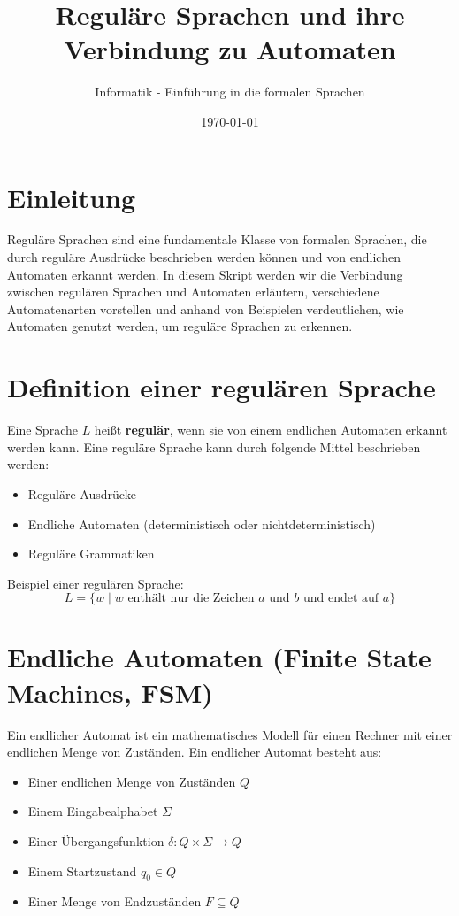 \documentclass[a4paper,12pt]{article}
\begin{document}
	
	\title{Reguläre Sprachen und ihre Verbindung zu Automaten}
	\author{Informatik - Einführung in die formalen Sprachen}
	\date{\today}
	\maketitle
	
	\section*{Einleitung}
	
	Reguläre Sprachen sind eine fundamentale Klasse von formalen Sprachen, die durch reguläre Ausdrücke beschrieben werden können und von endlichen Automaten erkannt werden. In diesem Skript werden wir die Verbindung zwischen regulären Sprachen und Automaten erläutern, verschiedene Automatenarten vorstellen und anhand von Beispielen verdeutlichen, wie Automaten genutzt werden, um reguläre Sprachen zu erkennen.
	
	\section{Definition einer regulären Sprache}
	
	Eine Sprache $L$ heißt \textbf{regulär}, wenn sie von einem endlichen Automaten erkannt werden kann. Eine reguläre Sprache kann durch folgende Mittel beschrieben werden:
	
	\begin{itemize}
		\item Reguläre Ausdrücke
		\item Endliche Automaten (deterministisch oder nichtdeterministisch)
		\item Reguläre Grammatiken
	\end{itemize}
	
	Beispiel einer regulären Sprache:
	\[ L = \{ w \mid w \text{ enthält nur die Zeichen } a \text{ und } b \text{ und endet auf } a \} \]
	
	\section{Endliche Automaten (Finite State Machines, FSM)}
	
	Ein endlicher Automat ist ein mathematisches Modell für einen Rechner mit einer endlichen Menge von Zuständen. Ein endlicher Automat besteht aus:
	
	\begin{itemize}
		\item Einer endlichen Menge von Zuständen $Q$
		\item Einem Eingabealphabet $\Sigma$
		\item Einer Übergangsfunktion $\delta: Q \times \Sigma \to Q$
		\item Einem Startzustand $q_0 \in Q$
		\item Einer Menge von Endzuständen $F \subseteq Q$
	\end{itemize}
	
\end{document}
